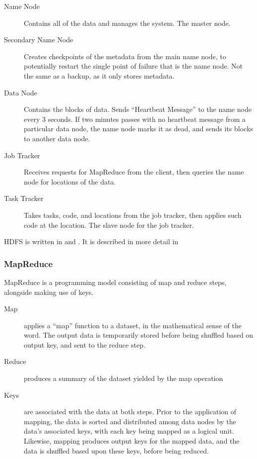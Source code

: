 \begin{description}

    \item[Name Node]
        Contains all of the data and manages the system. The master node.
    \item[Secondary Name Node]
        Creates checkpoints of the metadata from the main name node, to
        potentially restart the single point of failure that is the name node.
        Not the same as a backup, as it only stores metadata.
    \item[Data Node]
        Contains the blocks of data. Sends ``Heartbeat Message'' to the name
        node every 3 seconds. If two minutes passes with no heartbeat message
        from a particular data node, the name node marks it as dead, and sends
        its blocks to another data node.
    \item[Job Tracker]
        Receives requests for MapReduce from the client, then queries the name
        node for locations of the data.
    \item[Task Tracker]
        Takes tasks, code, and locations from the job tracker, then applies such
        code at the location. The slave node for the job tracker.
\end{description}

HDFS is written in  and . It is described in more detail in \cite{shvachko2010hadoop}

\subsubsection{MapReduce}\label{sec:mapreduce}

MapReduce is a programming model consisting of map and reduce steps,
alongside making use of keys.

\begin{description}

    \item[Map]
        applies a ``map'' function to a dataset, in the mathematical sense of
        the word. The output data is temporarily stored before being shuffled
        based on output key, and sent to the reduce step.
    \item[Reduce]
        produces a summary of the dataset yielded by the map operation
    \item[Keys]
        are associated with the data at both steps. Prior to the application of
        mapping, the data is sorted and distributed among data nodes by the
        data's associated keys, with each key being mapped as a logical unit.
        Likewise, mapping produces output keys for the mapped data, and the data
        is shuffled based upon these keys, before being reduced.
\end{description}

